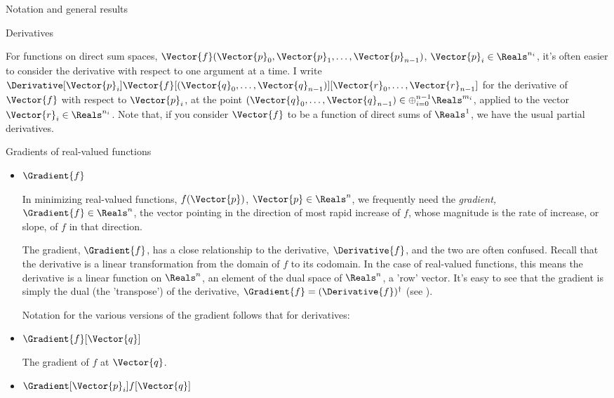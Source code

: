 \begin{plSection}{Notation and general results}
\begin{plSection}{Derivatives}
\begin{itemize}
For functions on direct sum spaces,
$\Vector{f}(\Vector{p}_0,\Vector{p}_1,\ldots,
\Vector{p}_{n-1})$, 
$\Vector{p}_i \in \Reals^{n_i}$,
it's often easier to consider the derivative
with respect to one argument at a time.
I write 
$\Derivative[\Vector{p}_i]{\Vector{f}}
[(\Vector{q}_0,\ldots,\Vector{q}_{n-1})]
[\Vector{r}_0,\ldots,\Vector{r}_{n-1}]$
for the derivative of $\Vector{f}$ with respect to $\Vector{p}_i$,
at the point 
$(\Vector{q}_0,\ldots,\Vector{q}_{n-1})
 \in \oplus_{i=0}^{n-1} \Reals^{m_i}$,
applied to the vector $\Vector{r}_i \in \Reals^{n_i}$.
Note that, if you consider $\Vector{f}$ to be a function
of direct sums of $\Reals^1$, we have the usual
partial derivatives.

\end{itemize}

\begin{plSection}{Gradients of real-valued functions}
\label{sec:gradients}

\begin{itemize}

\item $\Gradient{f}$

In minimizing real-valued functions, $f(\Vector{p})$, $\Vector{p} \in \Reals^n$,
we frequently need
the {\it gradient,} $\Gradient{f} \in \Reals^n$,
the vector pointing in the direction of most rapid increase of $f$,
whose magnitude is the rate of increase, or slope,
of $f$ in that direction.

The gradient, $\Gradient{f}$,
has a close relationship to the derivative, $\Derivative{f}$,
and the two are often confused.
Recall that the derivative is a linear transformation
from the domain of $f$ to its codomain.
In the case of real-valued functions,
this means the derivative is a linear function on $\Reals^n$,
an element of the dual space of $\Reals^n$, a 'row' vector.
It's easy to see that the gradient is simply the dual (the 'transpose')
of the derivative, $\Gradient{f} = (\Derivative{f})^{\dagger}$
(see ).

Notation for the various versions of the gradient
follows that for derivatives:

\item $\Gradient{f}[\Vector{q}]$

The gradient of $f$ at $\Vector{q}$.

\item $\Gradient[\Vector{p}_i]{f}[\Vector{q}]$


\end{itemize}
\end{plSection}
\end{plSection}
\end{plSection}
